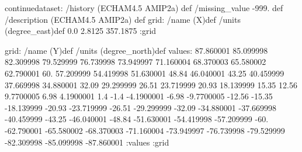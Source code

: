 \begin{ingrid}
continuedataset:
 /history (ECHAM4.5 AMIP2a) def
 /missing_value -999. def
 /description (ECHAM4.5 AMIP2a) def
grid:
/name (X)def
/units (degree_east)def
 0.0 2.8125 357.1875
:grid
\end{ingrid}
grid:
/name (Y)def
/units (degree_north)def
values: 87.860001 85.099998 82.309998 79.529999 76.739998 73.949997 71.160004 68.370003 65.580002 62.790001 60. 57.209999 54.419998 51.630001 48.84 46.040001 43.25 40.459999 37.669998 34.880001 32.09 29.299999 26.51 23.719999 20.93 18.139999 15.35 12.56 9.7700005 6.98 4.1900001 1.4 -1.4 -4.1900001 -6.98 -9.7700005 -12.56 -15.35 -18.139999 -20.93 -23.719999 -26.51 -29.299999 -32.09 -34.880001 -37.669998 -40.459999 -43.25 -46.040001 -48.84 -51.630001 -54.419998 -57.209999 -60. -62.790001 -65.580002 -68.370003 -71.160004 -73.949997 -76.739998 -79.529999 -82.309998 -85.099998 -87.860001 :values
:grid

